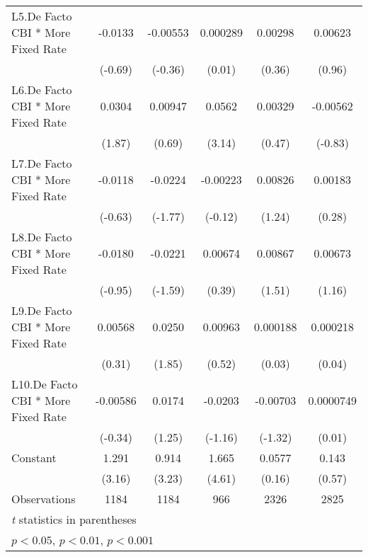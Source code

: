 {\begin{longtable}{l*{5}{c}}
\addlinespace
L5.De Facto CBI * More Fixed Rate&  -0.0133         & -0.00553         & 0.000289         &  0.00298         &  0.00623         \\
                &  (-0.69)         &  (-0.36)         &   (0.01)         &   (0.36)         &   (0.96)         \\
\addlinespace
L6.De Facto CBI * More Fixed Rate&   0.0304         &  0.00947         &   0.0562\sym{**} &  0.00329         & -0.00562         \\
                &   (1.87)         &   (0.69)         &   (3.14)         &   (0.47)         &  (-0.83)         \\
\addlinespace
L7.De Facto CBI * More Fixed Rate&  -0.0118         &  -0.0224         & -0.00223         &  0.00826         &  0.00183         \\
                &  (-0.63)         &  (-1.77)         &  (-0.12)         &   (1.24)         &   (0.28)         \\
\addlinespace
L8.De Facto CBI * More Fixed Rate&  -0.0180         &  -0.0221         &  0.00674         &  0.00867         &  0.00673         \\
                &  (-0.95)         &  (-1.59)         &   (0.39)         &   (1.51)         &   (1.16)         \\
\addlinespace
L9.De Facto CBI * More Fixed Rate&  0.00568         &   0.0250         &  0.00963         & 0.000188         & 0.000218         \\
                &   (0.31)         &   (1.85)         &   (0.52)         &   (0.03)         &   (0.04)         \\
\addlinespace
L10.De Facto CBI * More Fixed Rate& -0.00586         &   0.0174         &  -0.0203         & -0.00703         &0.0000749         \\
                &  (-0.34)         &   (1.25)         &  (-1.16)         &  (-1.32)         &   (0.01)         \\
\addlinespace
Constant        &    1.291\sym{**} &    0.914\sym{**} &    1.665\sym{***}&   0.0577         &    0.143         \\
                &   (3.16)         &   (3.23)         &   (4.61)         &   (0.16)         &   (0.57)         \\
\midrule
Observations    &     1184         &     1184         &      966         &     2326         &     2825         \\
\bottomrule
\multicolumn{6}{l}{\footnotesize \textit{t} statistics in parentheses}\\
\multicolumn{6}{l}{\footnotesize \sym{*} \(p<0.05\), \sym{**} \(p<0.01\), \sym{***} \(p<0.001\)}\\
\end{longtable}
}
